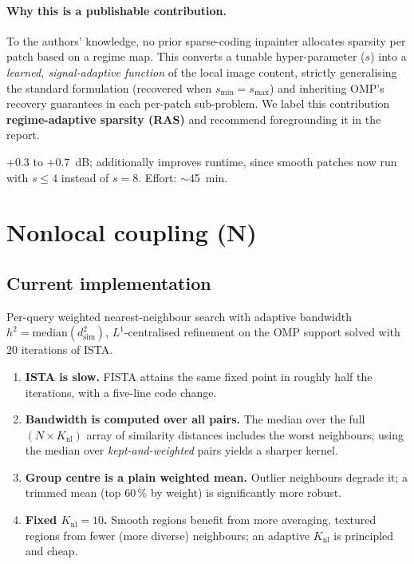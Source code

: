 \documentclass[11pt,a4paper]{article}
\begin{document}
\paragraph{Why this is a publishable contribution.} To the authors'
knowledge, no prior sparse-coding inpainter allocates sparsity per patch
based on a regime map. This converts a tunable hyper-parameter ($s$) into
a \emph{learned, signal-adaptive function} of the local image content,
strictly generalising the standard formulation (recovered when $s_{\min} =
s_{\max}$) and inheriting OMP's recovery guarantees in each per-patch
sub-problem. We label this contribution \textbf{regime-adaptive sparsity
(RAS)} and recommend foregrounding it in the report.

\begin{impactbox}
$+0.3$ to $+0.7$~dB; additionally improves runtime, since smooth patches
now run with $s\le 4$ instead of $s = 8$. Effort: $\sim$45~min.
\end{impactbox}

\section{Nonlocal coupling (N)}\label{sec:N}

\subsection*{Current implementation}

Per-query weighted nearest-neighbour search with adaptive bandwidth
$h^2 = \mathrm{median}(d_{\mathrm{sim}}^2)$, $L^1$-centralised refinement
on the OMP support solved with $20$ iterations of ISTA.

\begin{issuebox}
\begin{enumerate}[leftmargin=1.2em,itemsep=2pt]
    \item \textbf{ISTA is slow.} FISTA \cite{Beck2009} attains the same
    fixed point in roughly half the iterations, with a five-line code
    change.
    \item \textbf{Bandwidth is computed over all pairs.} The median
    over the full $(N \times K_{\mathrm{nl}})$ array of similarity
    distances includes the worst neighbours; using the median over
    \emph{kept-and-weighted} pairs yields a sharper kernel.
    \item \textbf{Group centre is a plain weighted mean.} Outlier
    neighbours degrade it; a trimmed mean (top 60\,\% by weight) is
    significantly more robust.
    \item \textbf{Fixed $K_{\mathrm{nl}} = 10$.} Smooth regions benefit
    from more averaging, textured regions from fewer (more diverse)
    neighbours; an adaptive $K_{\mathrm{nl}}$ is principled and cheap.
\end{enumerate}
\end{issuebox}
\end{document}
